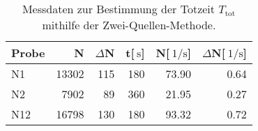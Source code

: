 
\begin{table}[!h]
\begin{center}
\begin{tabular}{|l|r|r|r|r|r|}
\hline
Probe & N & $\Delta$N & t[$\SI{}{\second}$] & N[$\SI{}{1\per\second}$] & $\Delta$N[$\SI{}{1\per\second}$]\\
\hline
\hline
N1 & 13302	& 115 & 180 & 73.90 & 0.64 \\
N2 & 7902	& 89  & 360 & 21.95 & 0.27 \\
N12 & 16798	& 130 & 180 & 93.32 & 0.72 \\
\hline
\end{tabular}
\caption[Aufgabe d]{Messdaten zur Bestimmung der Totzeit $T_\mathrm{tot}$ mithilfe der Zwei-Quellen-Methode.}
\label{tabelled}
\end{center}
\end{table}